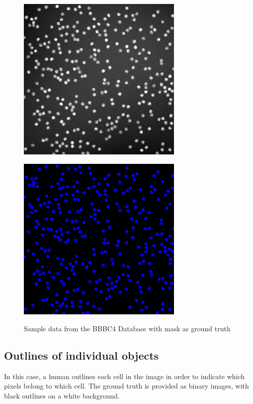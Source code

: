 \begin{figure}[H]
\begin{minipage}[c]{0.4\linewidth}
\centering
\includegraphics[width=80mm]{../images/BBBC4-1.jpg}
\label{fig:BBBC004_img}
\end{minipage}
\hfill
\begin{minipage}[c]{0.4\linewidth}
\centering
\includegraphics[width=80mm]{../images/BBBC4-1-F.jpg}
\label{fig:BBBC004_F}
\end{minipage}
\caption{Sample data from the BBBC4 Database with mask as ground truth}
\end{figure}

\subsection{Outlines of individual objects}
In this case, a human outlines each cell in the image in order to indicate which pixels belong to which cell. The ground truth is provided as binary images, with black outlines on a white background.

